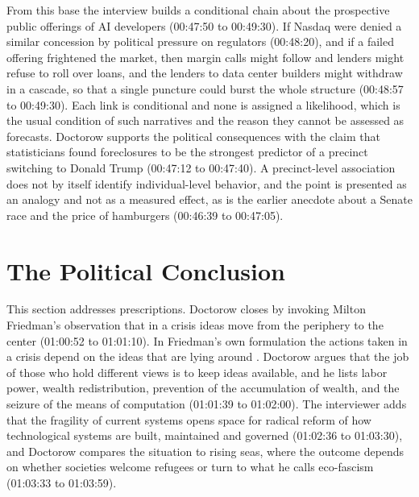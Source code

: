 \documentclass[12pt]{article}
\newcommand{\ts}[1]{(#1)}
\begin{document}
From this base the interview builds a conditional chain about the prospective public offerings of AI developers \ts{00:47:50 to 00:49:30}. If Nasdaq were denied a similar concession by political pressure on regulators \ts{00:48:20}, and if a failed offering frightened the market, then margin calls might follow and lenders might refuse to roll over loans, and the lenders to data center builders might withdraw in a cascade, so that a single puncture could burst the whole structure \ts{00:48:57 to 00:49:30}. Each link is conditional and none is assigned a likelihood, which is the usual condition of such narratives and the reason they cannot be assessed as forecasts. Doctorow supports the political consequences with the claim that statisticians found foreclosures to be the strongest predictor of a precinct switching to Donald Trump \ts{00:47:12 to 00:47:40}. A precinct-level association does not by itself identify individual-level behavior, and the point is presented as an analogy and not as a measured effect, as is the earlier anecdote about a Senate race and the price of hamburgers \ts{00:46:39 to 00:47:05}.

\section{The Political Conclusion}

This section addresses prescriptions. Doctorow closes by invoking Milton Friedman's observation that in a crisis ideas move from the periphery to the center \ts{01:00:52 to 01:01:10}. In Friedman's own formulation the actions taken in a crisis depend on the ideas that are lying around \cite{friedman}. Doctorow argues that the job of those who hold different views is to keep ideas available, and he lists labor power, wealth redistribution, prevention of the accumulation of wealth, and the seizure of the means of computation \ts{01:01:39 to 01:02:00}. The interviewer adds that the fragility of current systems opens space for radical reform of how technological systems are built, maintained and governed \ts{01:02:36 to 01:03:30}, and Doctorow compares the situation to rising seas, where the outcome depends on whether societies welcome refugees or turn to what he calls eco-fascism \ts{01:03:33 to 01:03:59}.
\end{document}
